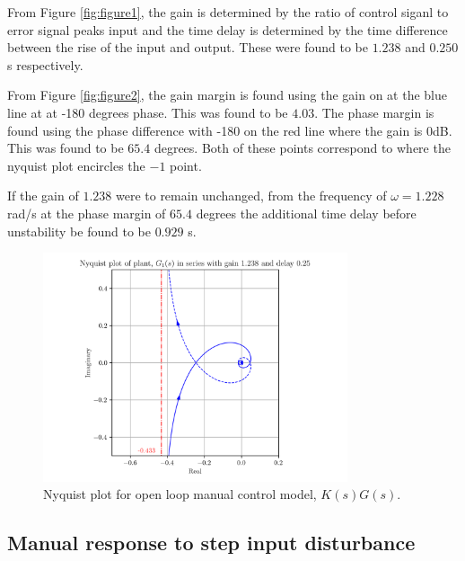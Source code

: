 \documentclass[8pt]{article}
\begin{document}
From Figure \ref{fig:figure1}, the gain is determined by the ratio of control siganl to error signal peaks input and the time delay is determined by the time difference between the rise of the input and output.
These were found to be $1.238$ and $0.250$ s respectively.

From Figure \ref{fig:figure2}, the gain margin is found using the gain on at the blue line at at -180 degrees phase. This was found to be $4.03$.
The phase margin is found using the phase difference with -180 on the red line where the gain is 0dB. This was found to be $65.4$ degrees. Both of these points correspond to where the nyquist plot encircles the $-1$ point.

If the gain of $1.238$ were to remain unchanged, from the frequency of $\omega = 1.228$ rad/s at the phase margin of $65.4$ degrees the additional time delay before unstability be found to be $0.929$ s.

\begin{figure}[H]
    \centering
    \includegraphics[width=0.8\textwidth]{figures/nyquist1.png}
    \caption{Nyquist plot for open loop manual control model, $K(s)G(s)$.}
    \label{fig:nyquist1}
\end{figure}

\subsection{Manual response to step input disturbance}
\end{document}
